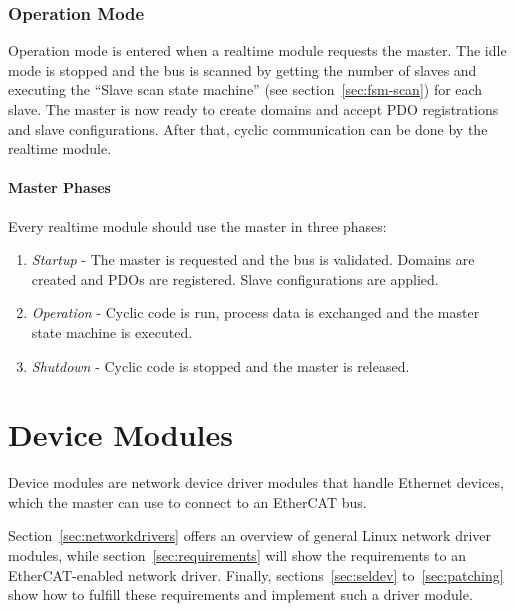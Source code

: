 \documentclass[a4paper,12pt,BCOR6mm,bibtotoc,idxtotoc]{scrbook}
\begin{document}
\subsubsection{Operation Mode}

Operation mode is entered when a realtime module requests the master.
The idle mode is stopped and the bus is scanned by getting the number
of slaves and executing the ``Slave scan state machine'' (see
section~\ref{sec:fsm-scan}) for each slave. The master is now ready to
create domains and accept PDO registrations and slave configurations.
After that, cyclic communication can be done by the realtime module.

\paragraph{Master Phases}

Every realtime module should use the master in three phases:

\begin{enumerate}
\item \textit{Startup} - The master is requested and the bus is
  validated. Domains are created and PDOs are registered. Slave
  configurations are applied.
\item \textit{Operation} - Cyclic code is run, process data is
  exchanged and the master state machine is executed.
\item \textit{Shutdown} - Cyclic code is stopped and the master
  is released.
\end{enumerate}


\section{Device Modules}
\label{sec:device}

Device modules are network device driver modules that handle Ethernet
devices, which the master can use to connect to an EtherCAT bus.

Section~\ref{sec:networkdrivers} offers an overview of general Linux
network driver modules, while section~\ref{sec:requirements} will show
the requirements to an EtherCAT-enabled network driver. Finally,
sections~\ref{sec:seldev} to~\ref{sec:patching} show how to fulfill
these requirements and implement such a driver module.
\end{document}
